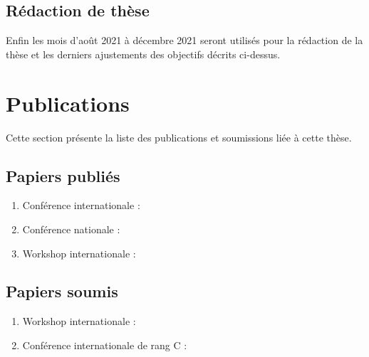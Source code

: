 \documentclass[a4paper]{article}
\begin{document}


\subsection{Rédaction de thèse}
\label{sec:redaction}

Enfin les mois d'août 2021 à décembre 2021 seront utilisés pour la rédaction de la thèse 
  et les derniers ajustements des objectifs décrits ci-dessus.


\section{Publications}

Cette section présente la liste des publications et soumissions liée à cette thèse.

\subsection{Papiers publiés}

\begin{enumerate}
  \item Conférence internationale : 
  \item Conférence nationale : 
  \item Workshop internationale : 
\end{enumerate}

\subsection{Papiers soumis}

\begin{enumerate}
  \item Workshop internationale : 
  \item Conférence internationale de rang C : 
\end{enumerate}
\end{document}
